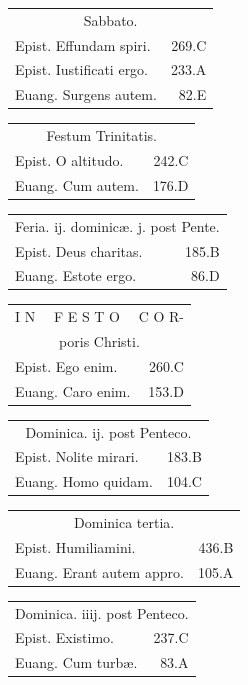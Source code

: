 \documentclass[a5paper,10pt]{book}
\def\ae{æ}
\begin{document}
\begin{multicols}{2}
\begin{tabular}{l r}
\end{tabular}
\begin{tabular}{l r}
\multicolumn{2}{c}{\color{red} Sabbato.}\\
Epist. Effundam spiri. & 269.C\\
Epist. Iustificati ergo. & 233.A\\
Euang. Surgens autem. & 82.E\\
\end{tabular}
\begin{tabular}{l r}
\multicolumn{2}{c}{\color{red} Festum Trinitatis.}\\
Epist. O altitudo. & 242.C\\
Euang. Cum autem. & 176.D\\
\end{tabular}
\begin{tabular}{l r}
\multicolumn{2}{c}{\color{red} Feria. ij. dominic\ae . j. post Pente.}\\
Epist. Deus charitas. & 185.B\\
Euang. Estote ergo. & 86.D\\
\end{tabular}
\begin{tabular}{l r}
\multicolumn{2}{c}{\color{red} \large I N \ \ F E S T O \ \ C O R-}\\
\multicolumn{2}{c}{\color{red} poris Christi.}\\
Epist. Ego enim. & 260.C\\
Euang. Caro enim. & 153.D\\%
\end{tabular}
\begin{tabular}{l r}
\multicolumn{2}{c}{\color{red} Dominica. ij. post Penteco.}\\
Epist. Nolite mirari. & 183.B\\
Euang. Homo quidam. & 104.C\\
\end{tabular}
\begin{tabular}{l r}
\multicolumn{2}{c}{\color{red} Dominica tertia.}\\
Epist. Humiliamini. & 436.B\\
Euang. Erant autem appro. & 105.A\\
\end{tabular}
\begin{tabular}{l r}
\multicolumn{2}{c}{\color{red} Dominica. iiij. post Penteco.}\\
Epist. Existimo. & 237.C\\
Euang. Cum turb\ae . & 83.A\\%

\end{tabular}
\end{multicols}
\end{document}
